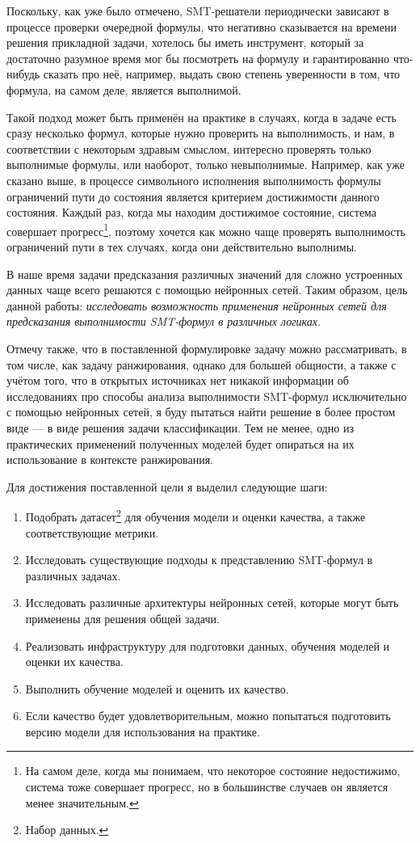 
Поскольку, как уже было отмечено, SMT-решатели периодически зависают в процессе проверки очередной формулы, что негативно сказывается на времени решения прикладной задачи, хотелось бы иметь инструмент, который за достаточно разумное время мог бы посмотреть на формулу и гарантированно что-нибудь сказать про неё, например, выдать свою степень уверенности в том, что формула, на самом деле, является выполнимой.

Такой подход может быть применён на практике в случаях, когда в задаче есть сразу несколько формул, которые нужно проверить на выполнимость, и нам, в соответствии с некоторым здравым смыслом, интересно проверять только выполнимые формулы, или наоборот, только невыполнимые. Например, как уже сказано выше, в процессе символьного исполнения выполнимость формулы ограничений пути до состояния является критерием достижимости данного состояния. Каждый раз, когда мы находим достижимое состояние, система совершает прогресс\footnote{На самом деле, когда мы понимаем, что некоторое состояние недостижимо, система тоже совершает прогресс, но в большинстве случаев он является менее значительным.}, поэтому хочется как можно чаще проверять выполнимость ограничений пути в тех случаях, когда они действительно выполнимы.

В наше время задачи предсказания различных значений для сложно устроенных данных чаще всего решаются с помощью нейронных сетей. Таким образом, цель данной работы: \textit{исследовать возможность применения нейронных сетей для предсказания выполнимости SMT-формул в различных логиках}.

Отмечу также, что в поставленной формулировке задачу можно рассматривать, в том числе, как задачу ранжирования, однако для большей общности, а также с учётом того, что в открытых источниках нет никакой информации об исследованиях про способы анализа выполнимости SMT-формул исключительно с помощью нейронных сетей, я буду пытаться найти решение в более простом виде --- в виде решения задачи классификации. Тем не менее, одно из практических применений полученных моделей будет опираться на их использование в контексте ранжирования.

Для достижения поставленной цели я выделил следующие шаги:

\begin{enumerate}
    \item Подобрать датасет\footnote{Набор данных.} для обучения модели и оценки качества, а также соответствующие метрики.
    \item Исследовать существующие подходы к представлению SMT-формул в различных задачах.
    \item Исследовать различные архитектуры нейронных сетей, которые могут быть применены для решения общей задачи.
    \item Реализовать инфраструктуру для подготовки данных, обучения моделей и оценки их качества.
    \item Выполнить обучение моделей и оценить их качество.
    \item Если качество будет удовлетворительным, можно попытаться подготовить версию модели для использования на практике.
\end{enumerate}

